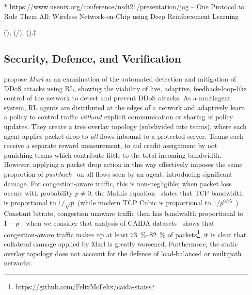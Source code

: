 * https://www.usenix.org/conference/nsdi21/presentation/jog -- One Protocol to Rule Them All: Wireless Network-on-Chip using Deep Reinforcement Learning

(\rllitstate), (\rllitact/\rllitactreal), (\rllitreward).$\dagger$

\subsection{Security, Defence, and Verification}
\textcite{DBLP:journals/eaai/MalialisK15} propose \emph{Marl} as an examination of the automated detection and mitigation of DDoS attacks using RL, showing the viability of live, adaptive, feedback-loop-like control of the network to detect and prevent DDoS attacks.
As a multiagent system, RL agents are distributed at the edges of a network and adaptively learn a policy to control traffic \emph{without} explicit communication or sharing of policy updates.
They create a tree overlay topology (subdivided into teams), where each agent applies packet drop to \emph{all} flows inbound to a protected server.
Teams each receive a separate reward measurement, to aid credit assignment by not punishing teams which contribute little to the total incoming bandwidth.
However, applying a packet drop action in this way effectively imposes the same proportion of \emph{pushback}~\cite{DBLP:journals/ccr/MahajanBFIPS02a} on all flows seen by an agent, introducing significant damage.
For congestion-aware traffic, this is non-negligible; when packet loss occurs with probability $p\ne0$, the Mathis equation~\cite{DBLP:journals/ccr/MathisSMO97} states that TCP bandwidth is proportional to $1/\sqrt{p}$ (while modern TCP Cubic is proportional to $1/p^{0.75}$~\cite{rfc8312}).
Constant bitrate, congestion unaware traffic then has bandwidth proportional to $1 - p$---when we consider that analysis of CAIDA datasets~\cite{caida-2018-passive} shows that congestion-aware traffic makes up at least \SIrange{73}{82}{\percent} of packets\footnote{\url{https://github.com/FelixMcFelix/caida-stats}}, it is clear that collateral damage applied by Marl is greatly worsened.
Furthermore, the static overlay topology does not account for the defence of load-balanced or multipath networks.

